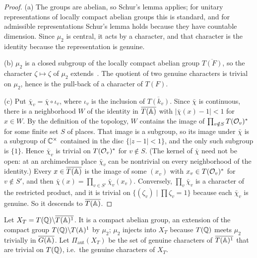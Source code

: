 \begin{proof}
(a) The groups are abelian, so Schur's lemma applies; for unitary
representations of locally compact abelian groups this is standard, and
for admissible representations Schur's lemma holds because they have
countable dimension. Since $\mu_2$ is central, it acts by a character,
and that character is the identity because the representation is
genuine.

(b) $\mu_2$ is a closed subgroup of the locally compact abelian group
$\overline{T(F)}$, so the character $\zeta\mapsto\zeta$ of $\mu_2$
extends~\cite{Ro83}. The quotient of two genuine characters is trivial on
$\mu_2$, hence is the pull-back of a character of $T(F)$.

(c) Put $\bar\chi_v=\bar\chi\circ\iota_v$, where $\iota_v$ is the
inclusion of $\overline{T(k_v)}$. Since $\bar\chi$ is continuous, there
is a neighborhood $W$ of the identity in $\overline{T(\mathbb{A})}$ with
$|\bar\chi(x)-1|<1$ for $x\in W$. By the definition of the topology, $W$
contains the image of $\prod_{v\notin S}T(\mathcal{O}_v)^*$ for some finite set
$S$ of places. That image is a subgroup, so its image under $\bar\chi$ is
a subgroup of $\mathbb{C}^\times$ contained in the disc $\{|z-1|<1\}$, and the
only such subgroup is $\{1\}$. Hence $\bar\chi_v$ is trivial on
$T(\mathcal{O}_v)^*$ for $v\notin S$. (The kernel of $\bar\chi$ need not be open:
at an archimedean place $\bar\chi_v$ can be nontrivial on every
neighborhood of the identity.) Every $x\in\overline{T(\mathbb{A})}$ is the image of
some $(x_v)$ with $x_v\in T(\mathcal{O}_v)^*$ for $v\notin S'$, and then
$\bar\chi(x)=\prod_{v\in S'}\bar\chi_v(x_v)$. Conversely, $\prod_v
\bar\chi_v$ is a character of the restricted product, and it is trivial
on $\{(\zeta_v)\mid\prod\zeta_v=1\}$ because each $\bar\chi_v$ is
genuine. So it descends to $\overline{T(\mathbb{A})}$.
\end{proof}

Let $X_T=T(\mathbb{Q})\backslash\overline{T(\mathbb{A})^1}$. It is a compact abelian
group, an extension of the compact group $T(\mathbb{Q})\backslash T(\mathbb{A})^1$ by
$\mu_2$; $\mu_2$ injects into $X_T$ because $T(\mathbb{Q})$ meets $\mu_2$
trivially in $\overline{G(\mathbb{A})}$. Let $\Pi_{\mathrm{aut}}(X_T)$ be the set
of genuine characters of $\overline{T(\mathbb{A})^1}$ that are trivial on
$T(\mathbb{Q})$, i.e.\ the genuine characters of $X_T$.

